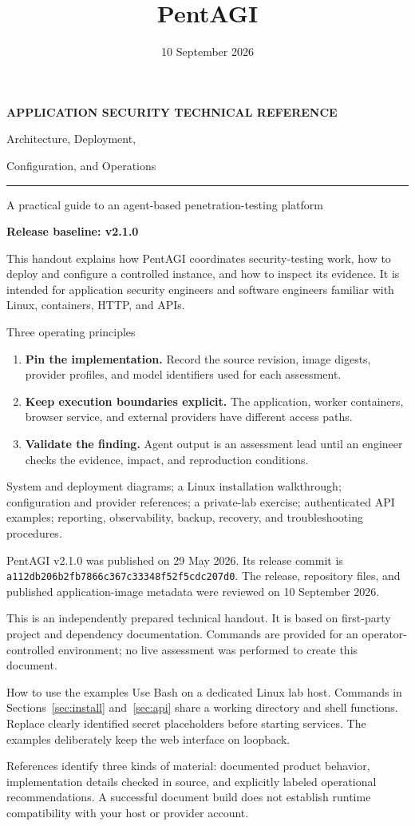 \documentclass[11pt,letterpaper]{article}
\title{PentAGI}
\author{}
\date{10 September 2026}
\makeatletter
\newcommand{\code}[1]{\nolinkurl{#1}}
\newcommand{\src}[1]{\cite{#1}}
\newcommand{\smallhead}[1]{\par\medskip{\sffamily\bfseries\color{Navy}#1}\par}
\renewcommand{\maketitle}{
\thispagestyle{empty}
{\sffamily\small\bfseries\color{Teal}APPLICATION SECURITY \hfill TECHNICAL REFERENCE}\par
\vspace{12mm}
{\sffamily\fontsize{44}{48}\selectfont\bfseries\color{Navy}\@title\par}
\vspace{5mm}
{\sffamily\fontsize{21}{27}\selectfont\color{Navy}
Architecture, Deployment,\par Configuration, and Operations\par}
\vspace{7mm}
{\color{Teal}\rule{\textwidth}{1.3pt}}\par
\vspace{4mm}
{\large A practical guide to an agent-based penetration-testing platform}\par
\vspace{8mm}
{\sffamily\bfseries Release baseline: v2.1.0 \hfill \@date}\par
}
\makeatother
\begin{document}
\maketitle

This handout explains how PentAGI coordinates security-testing work, how to
deploy and configure a controlled instance, and how to inspect its evidence.
It is intended for application security engineers and software engineers
familiar with Linux, containers, HTTP, and APIs.

\begin{panel}{Three operating principles}
\begin{enumerate}
\item \textbf{Pin the implementation.} Record the source revision, image digests,
provider profiles, and model identifiers used for each assessment.
\item \textbf{Keep execution boundaries explicit.} The application, worker
containers, browser service, and external providers have different access paths.
\item \textbf{Validate the finding.} Agent output is an assessment lead until
an engineer checks the evidence, impact, and reproduction conditions.
\end{enumerate}
\end{panel}

\smallhead{What this document contains}
System and deployment diagrams; a Linux installation walkthrough; configuration
and provider references; a private-lab exercise; authenticated API examples;
reporting, observability, backup, recovery, and troubleshooting procedures.

\smallhead{Evidence baseline}
PentAGI v2.1.0 was published on 29 May 2026. Its release commit is
\code{a112db206b2fb7866c367c33348f52f5cdc207d0}.
The release, repository files, and published application-image metadata were
reviewed on 10 September 2026. \src{release,image,ci}

\vfill
{\small\color{Muted}
This is an independently prepared technical handout. It is based on
first-party project and dependency documentation. Commands are provided for an
operator-controlled environment; no live assessment was performed to create
this document.}
\clearpage
\setcounter{tocdepth}{1}
\tableofcontents
\vspace{8pt}
\begin{panel}{How to use the examples}
Use Bash on a dedicated Linux lab host. Commands in Sections~\ref{sec:install}
and~\ref{sec:api} share a working directory and shell functions.
Replace clearly identified secret placeholders before starting services.
The examples deliberately keep the web interface on loopback.

References identify three kinds of material: documented product behavior,
implementation details checked in source, and explicitly labeled operational
recommendations. A successful document build does not establish runtime
compatibility with your host or provider account.
\end{panel}
\end{document}
